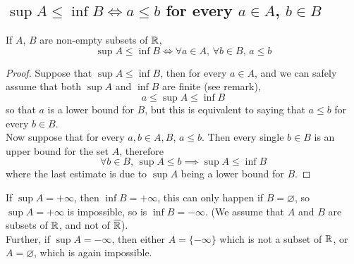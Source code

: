 \documentclass[../../main.tex]{subfiles}
\begin{document}
\subsection{$\sup A\leq \inf B\iff a\leq b$ for every $a\in A$, $b\in B$}
\begin{wts}\label{lemma: a leq b for every a and b}
    If $A$, $B$ are non-empty subsets of $\mathbb{R}$,
    \[
    \sup A\leq \inf B \iff \forall a\in A,\,\forall b\in B,\, a\leq b
    \]
\end{wts}
\begin{proof}
    Suppose that $\sup A\leq \inf B$, then for every $a\in A$, and we can safely assume that both $\sup A$ and $\inf B$ are finite (see remark),
    \[
    a\leq \sup A\leq \inf B
    \]
    so that $a$ is a lower bound for $B$, but this is equivalent to saying that $a\leq b$ for every $b\in B$.\\
    
    Now suppose that for every $a,b\in A,B$, $a\leq b$. Then every single $b\in B$ is an upper bound for the set $A$, therefore
    \[
    \forall b\in B,\, \sup A\leq b\implies \sup A\leq \inf B
    \]
    where the last estimate is due to $\sup A$ being a lower bound for $B$.
\end{proof}
\begin{remark}
    If $\sup A = +\infty$, then $\inf B = +\infty$, this can only happen if $B=\varnothing$, so $\sup A = +\infty$ is impossible, so is $\inf B = -\infty$. (We assume that $A$ and $B$ are subsets of $\mathbb{R}$, and not of $\overline{\mathbb{R}}$).\\
    
    Further, if $\sup A = -\infty$, then either $A=\{-\infty\}$ which is not a subset of $\mathbb{R}$, or $A=\varnothing$, which is again impossible.
\end{remark}
\end{document}
